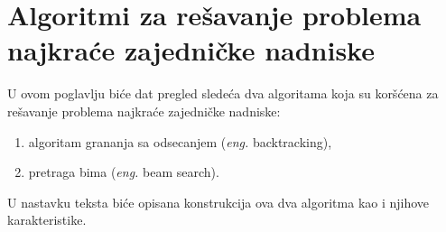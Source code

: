 \documentclass[12pt,oneside]{memoir}
\begin{document}

\chapter{Algoritmi za rešavanje problema najkraće zajedničke nadniske}
U ovom poglavlju biće dat pregled sledeća dva algoritama koja su koršćena za rešavanje problema najkraće zajedničke
nadniske:
\label{chap:algoritmi}

\begin{enumerate}
  \item algoritam grananja sa odsecanjem (\textit{eng.} backtracking),
  \item pretraga bima (\textit{eng.} beam search).
\end{enumerate}
U nastavku teksta biće opisana konstrukcija ova dva algoritma kao i njihove karakteristike.
\end{document}
